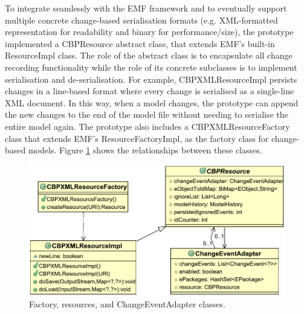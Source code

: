 To integrate seamlessly with the EMF framework and to eventually support multiple concrete change-based serialisation formats (e.g. XML-formatted representation for readability and binary for performance/size), the prototype implemented a \textsf{CBPResource} abstract class, that extends EMF's built-in \textsf{ResourceImpl} class. The role of the abstract class is to encapsulate all change recording functionality while the role of its concrete subclasses is to implement serialisation and de-serialisation. For example, \textsf{CBPXMLResourceImpl} persists changes in a line-based format where every change is serialised as a single-line XML document. In this way, when a model changes, the prototype can append the new changes to the end of the model file without needing to serialise the entire model again. The prototype also includes a \textsf{CBPXMLResourceFactory} class that extends EMF's \textsf{ResourceFactoryImpl}, as the factory class for change-based models. Figure \ref{fig:resources} shows the relationships between these classes.

\begin{figure}[th]
  \centering
  \includegraphics[width=\linewidth]{resources}
  \caption{Factory, resources, and ChangeEventAdapter classes.}
  \label{fig:resources}
\end{figure}

